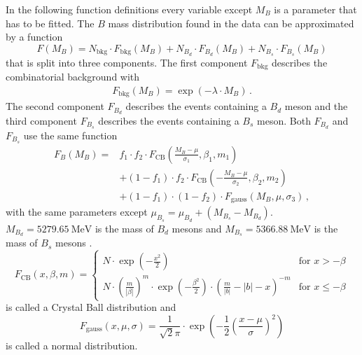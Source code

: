 In the following function definitions every variable except $M_B$ is a parameter that has to be fitted.
The $B$ mass distribution found in the data can be approximated by a function
\begin{equation*}
    F(M_B) = N_\text{bkg} \cdot F_\text{bkg}(M_B) + N_{B_d} \cdot F_{B_d}(M_B) + N_{B_s} \cdot F_{B_s}(M_B)
\end{equation*}
that is split into three components.
The first component $F_\text{bkg}$ describes the combinatorial background with 
\begin{align*}
    F_\text{bkg}(M_B) = \exp(-\lambda \cdot M_B) \, .
\end{align*}
The second component $F_{B_d}$ describes the events containing a $B_d$ meson and the third component $F_{B_s}$ describes the events containing a $B_s$ meson.
Both $F_{B_d}$ and $F_{B_s}$ use the same function
\begin{align*}
    F_B(M_B) = &f_1 \cdot f_2 \cdot F_\text{CB}\left(\frac{M_B-\mu}{\sigma_1}, \beta_1, m_1\right) \\
                    &+ (1-f_1) \cdot f_2 \cdot F_\text{CB}\left(-\frac{M_B-\mu}{\sigma_2}, \beta_2, m_2\right) \\
                    &+ (1-f_1) \cdot (1-f_2) \cdot F_\text{gauss}\left(M_B,\mu,\sigma_3\right) \, ,
\end{align*}
with the same parameters except $\mu_{B_s} = \mu_{B_d} + (M_{B_s}-M_{B_d})$.
$M_{B_d}=\qty{5279.65}{\MeV}$ is the mass of $B_d$ mesons and $M_{B_s}=\qty{5366.88}{\MeV}$ is the mass of $B_s$ mesons \cite{pdg}.
\begin{equation*}
    F_\text{CB}(x,\beta,m) = 
     \begin{cases}
         N \cdot \exp(-\frac{x^2}{2}) & \text{for } x > -\beta \\
         N \cdot \left(\frac{m}{|\beta|}\right)^m \cdot \exp\left(-\frac{\beta^2}{2}\right) \cdot \left(\frac{m}{|b|}-|b| - x\right)^{-m} & \text{for } x \leq -\beta
     \end{cases}
\end{equation*}
is called a Crystal Ball distribution and
\begin{equation*}
    F_\text{gauss}\left(x,\mu,\sigma\right) = \frac{1}{\sqrt{2}\pi} \cdot \exp\left(-\frac{1}{2}\left(\frac{x-\mu}{\sigma}\right)^2\right)
\end{equation*}
is called a normal distribution.

